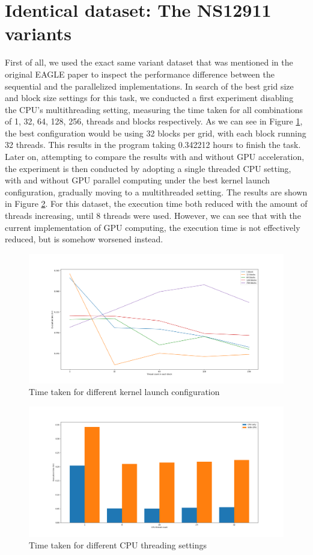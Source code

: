 \documentclass{PHlab-thesis}
\begin{document}
\section{Identical dataset: The NS12911 variants}
First of all, we used the exact same variant dataset that was mentioned in the original EAGLE paper to inspect the performance difference between the sequential and the parallelized implementations. In search of the best grid size and block size settings for this task, we conducted a first experiment disabling the CPU's multithreading setting, measuring the time taken for all combinations of 1, 32, 64, 128, 256, threads and blocks respectively. As we can see in Figure \ref{fig:gpuconfig}, the best configuration would be using 32 blocks per grid, with each block running 32 threads. This results in the program taking 0.342212 hours to finish the task. Later on, attempting to compare the results with and without GPU acceleration, the experiment is then conducted by adopting a single threaded CPU setting, with and without GPU parallel computing under the best kernel launch configuration, gradually moving to a multithreaded setting. The results are shown in Figure \ref{fig:multithread}. For this dataset, the execution time both reduced with the amount of threads increasing, until 8 threads were used. However, we can see that with the current implementation of GPU computing, the execution time is not effectively reduced, but is somehow worsened instead.
\begin{figure}
	\centering
	\includegraphics[scale=0.3]{figures/gpu_config.png}
	\caption{Time taken for different kernel launch configuration}
	\label{fig:gpuconfig} 
\end{figure}
\begin{figure}
	\centering
	\includegraphics[scale=0.3]{figures/multithread.png}
	\caption{Time taken for different CPU threading settings}
	\label{fig:multithread} 
\end{figure}
\end{document}
